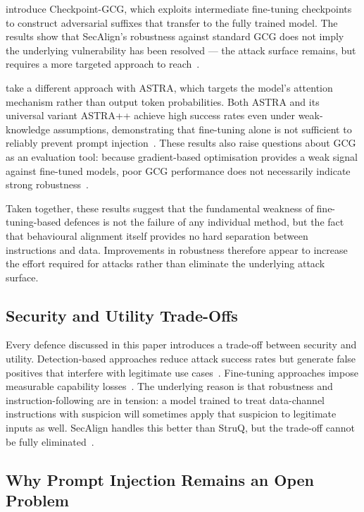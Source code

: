 \textcite{yang2025checkpointgcg} introduce Checkpoint-GCG, which exploits
intermediate fine-tuning checkpoints to construct adversarial suffixes that
transfer to the fully trained model. The results show that SecAlign's
robustness against standard GCG does not imply the underlying vulnerability
has been resolved --- the attack surface remains, but requires a more targeted
approach to reach~\parencite{yang2025checkpointgcg}.

\textcite{pandya2025astra} take a different approach with ASTRA, which targets
the model's attention mechanism rather than output token probabilities. Both
ASTRA and its universal variant ASTRA++ achieve high success rates even under
weak-knowledge assumptions, demonstrating that fine-tuning alone is not
sufficient to reliably prevent prompt injection~\parencite{pandya2025astra}.
These results also raise questions about GCG as an evaluation tool: because
gradient-based optimisation provides a weak signal against fine-tuned models,
poor GCG performance does not necessarily indicate strong
robustness~\parencite{pandya2025astra}.

Taken together, these results suggest that the fundamental weakness of
fine-tuning-based defences is not the failure of any individual method, but
the fact that behavioural alignment itself provides no hard separation between
instructions and data. Improvements in robustness therefore appear to increase
the effort required for attacks rather than eliminate the underlying attack surface.

\subsection{Security and Utility Trade-Offs}

Every defence discussed in this paper introduces a trade-off between security
and utility. Detection-based approaches reduce attack success rates but
generate false positives that interfere with legitimate use
cases~\parencite{debenedetti2024agentdojo, jia2025critical}. Fine-tuning
approaches impose measurable capability losses~\parencite{jia2025critical}.
The underlying reason is that robustness and instruction-following are in
tension: a model trained to treat data-channel instructions with suspicion will
sometimes apply that suspicion to legitimate inputs as well. SecAlign handles
this better than StruQ, but the trade-off cannot be fully
eliminated~\parencite{chen2025secalign}.

\subsection{Why Prompt Injection Remains an Open Problem}

